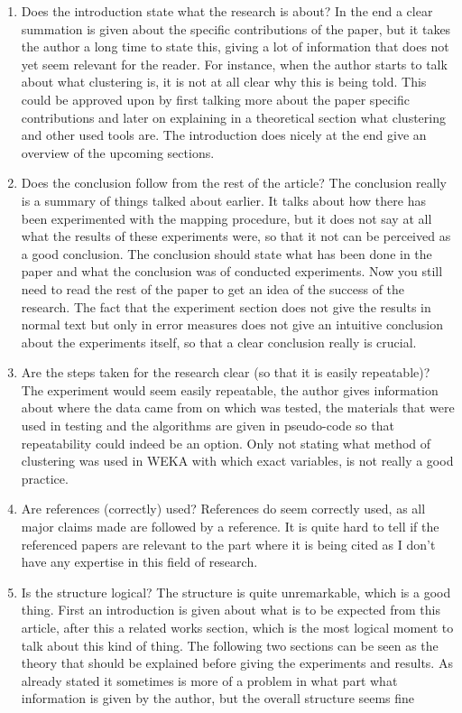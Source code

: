 \documentclass{article}
\begin{document}
\begin{enumerate}
{        \begin{enumerate}
    \item{Does the introduction state what the research is about? In the end a clear summation is given about the specific contributions of the paper, but it takes the author a long time to state this, giving a lot of information that does not yet seem relevant for the reader. For instance, when the author starts to talk about what clustering is, it is not at all clear why this is being told. This could be approved upon by first talking more about the paper specific contributions and later on explaining in a theoretical section what clustering and other used tools are. The introduction does nicely at the end give an overview of the upcoming sections.}
    \item{Does the conclusion follow from the rest of the article?
    The conclusion really is a summary of things talked about earlier. It talks about how there has been experimented with the mapping procedure, but it does not say at all what the results of these experiments were, so that it not can be perceived as a good conclusion. The conclusion should state what has been done in the paper and what the conclusion was of conducted experiments. Now you still need to read the rest of the paper to get an idea of the success of the research. The fact that the experiment section does not give the results in normal text but only in error measures does not give an intuitive conclusion about the experiments itself, so that a clear conclusion really is crucial.}
    \item{Are the steps taken for the research clear (so that it is easily repeatable)?}
    The experiment would seem easily repeatable, the author gives information about where the data came from on which was tested, the materials that were used in testing and the algorithms are given in pseudo-code so that repeatability could indeed be an option. Only not stating what method of clustering was used in WEKA with which exact variables, is not really a good practice.
    \item{Are references (correctly) used?}
    References do seem correctly used, as all major claims made are followed by a reference. It is quite hard to tell if the referenced papers are relevant to the part where it is being cited as I don't have any expertise in this field of research.
    \item{Is the structure logical?}
    The structure is quite unremarkable, which is a good thing. First an introduction is given about what is to be expected from this article, after this a related works section, which is the most logical moment to talk about this kind of thing. The following two sections can be seen as the theory that should be explained before giving the experiments and results. As already stated it sometimes is more of a problem in what part what information is given by the author, but the overall structure seems fine

\end{enumerate}}
\end{enumerate}
\end{document}
